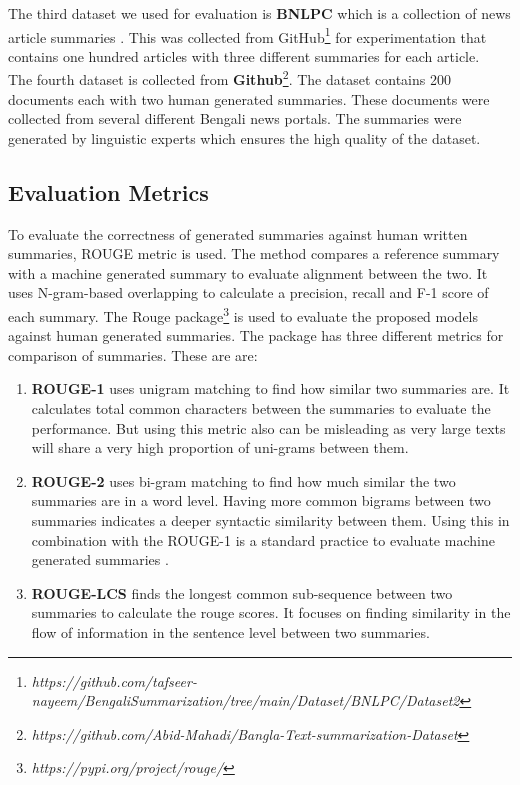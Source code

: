 \documentclass[acmlarge]{acmart}
\begin{document}
The third dataset we used for evaluation is \textbf{BNLPC} which is a collection of news article summaries \cite{Hque-2015-BNLPC-Dataset}. This was collected from GitHub\footnote{\textit{https://github.com/tafseer-nayeem/BengaliSummarization/tree/main/Dataset/BNLPC/Dataset2}} for experimentation that contains one hundred articles with three different summaries for each article.\\

The fourth dataset is collected from \textbf{Github}\footnote{\textit{https://github.com/Abid-Mahadi/Bangla-Text-summarization-Dataset}}. The dataset contains 200 documents each with two human generated summaries. These documents were collected from several different Bengali news portals. The summaries were generated by linguistic experts which ensures the high quality of the dataset.

\subsection{Evaluation Metrics}\label{subsec:evaluation-metrics}
To evaluate the correctness of generated summaries against human written summaries, ROUGE metric \cite{lin-2004-rouge} is used. The method compares a reference summary with a machine generated summary to evaluate alignment between the two. It uses N-gram-based overlapping to calculate a precision, recall and F-1 score of each summary. The Rouge package\footnote{\textit{https://pypi.org/project/rouge/}} is used to evaluate the proposed models against human generated summaries. The package has three different metrics for comparison of summaries. These are are:

\begin{enumerate}
	\item \textbf{ROUGE-1} uses unigram matching to find how similar two summaries are. It calculates total common characters between the summaries to evaluate the performance. But using this metric also can be misleading as very large texts will share a very high proportion of uni-grams between them.
	
	\item \textbf{ROUGE-2} uses bi-gram matching to find how much similar the two summaries are in a word level. Having more common bigrams between two summaries indicates a deeper syntactic similarity between them. Using this in combination with the ROUGE-1 is a standard practice to evaluate machine generated summaries \cite{wafaa-2021-summary-comprehensive-review}.
	
	\item \textbf{ROUGE-LCS} finds the longest common sub-sequence between two summaries to calculate the rouge scores. It focuses on finding similarity in the flow of information in the sentence level between two summaries.
\end{enumerate}
\end{document}
